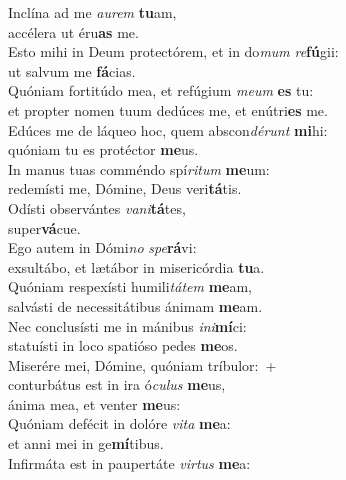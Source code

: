 \evenverse Inclína ad me \textit{au}\textit{rem} \textbf{tu}am,~\*\\
\evenverse accélera ut éru\textbf{as} me.\\
\oddverse Esto mihi in Deum protectórem, et in do\textit{mum} \textit{re}\textbf{fú}gii:~\*\\
\oddverse ut salvum me \textbf{fá}cias.\\
\evenverse Quóniam fortitúdo mea, et refúgium \textit{me}\textit{um} \textbf{es} tu:~\*\\
\evenverse et propter nomen tuum dedúces me, et enútri\textbf{es} me.\\
\oddverse Edúces me de láqueo hoc, quem abscon\textit{dé}\textit{runt} \textbf{mi}hi:~\*\\
\oddverse quóniam tu es protéctor \textbf{me}us.\\
\evenverse In manus tuas comméndo spí\textit{ri}\textit{tum} \textbf{me}um:~\*\\
\evenverse redemísti me, Dómine, Deus veri\textbf{tá}tis.\\
\oddverse Odísti observántes \textit{va}\textit{ni}\textbf{tá}tes,~\*\\
\oddverse super\textbf{vá}cue.\\
\evenverse Ego autem in Dómi\textit{no} \textit{spe}\textbf{rá}vi:~\*\\
\evenverse exsultábo, et lætábor in misericórdia \textbf{tu}a.\\
\oddverse Quóniam respexísti humili\textit{tá}\textit{tem} \textbf{me}am,~\*\\
\oddverse salvásti de necessitátibus ánimam \textbf{me}am.\\
\evenverse Nec conclusísti me in mánibus \textit{i}\textit{ni}\textbf{mí}ci:~\*\\
\evenverse statuísti in loco spatióso pedes \textbf{me}os.\\
\oddverse Miserére mei, Dómine, quóniam tríbulor:~+\\
\oddverse  conturbátus est in ira ó\textit{cu}\textit{lus} \textbf{me}us,~\*\\
\oddverse ánima mea, et venter \textbf{me}us:\\
\evenverse Quóniam defécit in dolóre \textit{vi}\textit{ta} \textbf{me}a:~\*\\
\evenverse et anni mei in ge\textbf{mí}tibus.\\
\oddverse Infirmáta est in paupertáte \textit{vir}\textit{tus} \textbf{me}a:~\*\\
